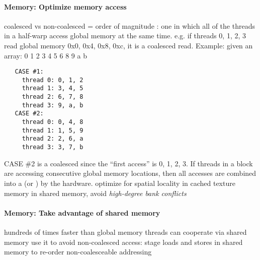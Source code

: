 \documentclass{myart}
\begin{document}
\paragraph{Memory: Optimize memory access}
\bit
\w coalesced vs non-coalesced = order of magnitude
  \bit
  \w {}: one in which all of the threads in a
  half-warp access global memory at the same time. e.g. if threads 0, 1, 2, 3
  read global memory 0x0, 0x4, 0x8, 0xc, it is a coalesced read.
  \w Example: given an array: 0 1 2 3 4 5 6 8 9 a b
   \begin{verbatim}
   CASE #1: 
     thread 0: 0, 1, 2
     thread 1: 3, 4, 5
     thread 2: 6, 7, 8
     thread 3: 9, a, b
   CASE #2: 
     thread 0: 0, 4, 8
     thread 1: 1, 5, 9
     thread 2: 2, 6, a
     thread 3: 3, 7, b
   \end{verbatim}
    CASE \#2 is a coalesced since the ``first access'' is 0, 1, 2, 3. If threads
    in a block are accessing consecutive global memory locations, then all
    accesses are combined into a  (or ) by the
      hardware. 
  \eit
\w optimize for spatial locality in cached texture memory
\w in shared memory, avoid {\em high-degree bank conflicts}
\eit
\paragraph{Memory: Take advantage of shared memory}
\bit
\w hundreds of times faster than global memory
\w threads can cooperate via shared memory
\w use it to avoid non-coalesced access: stage loads and stores in shared
memory to re-order non-coalesceable addressing
\eit




\nocite{CUDAPG42}
\end{document}

